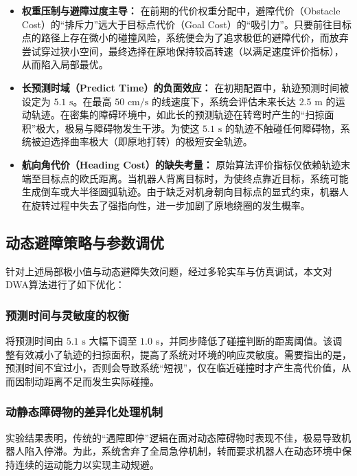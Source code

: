 \begin{itemize}
    \item \textbf{权重压制与避障过度主导：} 在前期的代价权重分配中，避障代价（Obstacle Cost）的“排斥力”远大于目标点代价（Goal Cost）的“吸引力”。只要前往目标点的路径上存在微小的碰撞风险，系统便会为了追求极低的避障代价，而放弃尝试穿过狭小空间，最终选择在原地保持较高转速（以满足速度评价指标），从而陷入局部最优。
    
    \item \textbf{长预测时域（Predict Time）的负面效应：} 在初期配置中，轨迹预测时间被设定为 $5.1\text{ s}$。在最高 $50\text{ cm/s}$ 的线速度下，系统会评估未来长达 $2.5\text{ m}$ 的运动轨迹。在密集的障碍环境中，如此长的预测轨迹在转弯时产生的“扫掠面积”极大，极易与障碍物发生干涉。为使这 $5.1\text{ s}$ 的轨迹不触碰任何障碍物，系统被迫选择曲率极大（即原地打转）的极短安全轨迹。
    
    \item \textbf{航向角代价（Heading Cost）的缺失考量：} 原始算法评价指标仅依赖轨迹末端至目标点的欧氏距离。当机器人背离目标时，为使终点靠近目标，系统可能生成倒车或大半径圆弧轨迹。由于缺乏对机身朝向目标点的显式约束，机器人在旋转过程中失去了强指向性，进一步加剧了原地绕圈的发生概率。
\end{itemize}

\subsection{动态避障策略与参数调优}

针对上述局部极小值与动态避障失效问题，经过多轮实车与仿真调试，本文对DWA算法进行了如下优化：

\subsubsection{预测时间与灵敏度的权衡}
将预测时间由 $5.1\text{ s}$ 大幅下调至 $1.0\text{ s}$，并同步降低了碰撞判断的距离阈值。该调整有效减小了轨迹的扫掠面积，提高了系统对环境的响应灵敏度。需要指出的是，预测时间不宜过小，否则会导致系统“短视”，仅在临近碰撞时才产生高代价值，从而因制动距离不足而发生实际碰撞。

\subsubsection{动静态障碍物的差异化处理机制}
实验结果表明，传统的“遇障即停”逻辑在面对动态障碍物时表现不佳，极易导致机器人陷入停滞。为此，系统舍弃了全局急停机制，转而要求机器人在动态环境中保持连续的运动能力以实现主动规避。

